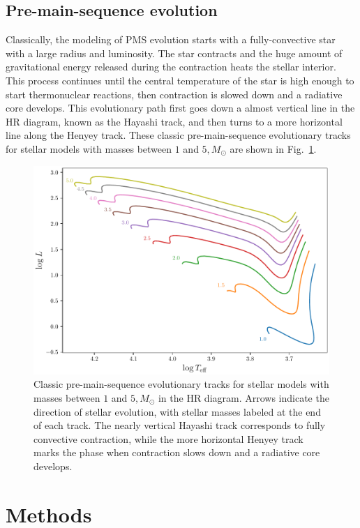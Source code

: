 \documentclass[12pt,a4paper]{article}
\begin{document}
\subsection{Pre-main-sequence evolution}
\label{sec:pms_evolution}

Classically, the modeling of PMS evolution starts with a fully-convective star with a large radius and luminosity. The star contracts and the huge amount of gravitational energy released during the contraction heats the stellar interior. This process continues until the central temperature of the star is high enough to start thermonuclear reactions, then contraction is slowed down and a radiative core develops. This evolutionary path first goes down a almost vertical line in the HR diagram, known as the Hayashi track, and then turns to a more horizontal line along the Henyey track. These classic pre-main-sequence evolutionary tracks for stellar models with masses between $1$ and $5,M_\odot$ are shown in Fig.~\ref{fig:hayashi_henyey_tracks}.

\begin{figure}
  \centering
  \includegraphics[width=.8\textwidth]{classic_pms.pdf}
  \caption{Classic pre-main-sequence evolutionary tracks for stellar models with masses between $1$ and $5,M_\odot$ in the HR diagram. Arrows indicate the direction of stellar evolution, with stellar masses labeled at the end of each track. The nearly vertical Hayashi track corresponds to fully convective contraction, while the more horizontal Henyey track marks the phase when contraction slows down and a radiative core develops.} \label{fig:hayashi_henyey_tracks}
\end{figure}

\section{Methods}
\label{sec:methods}
\end{document}

